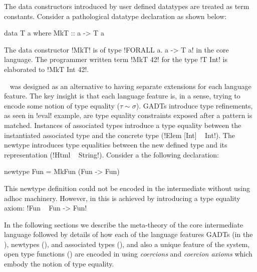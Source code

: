 \documentclass[screen,nonacm,manuscript,review]{acmart} %
\begin{document}
The data constructors introduced by user defined datatypes are treated as
term constants. Consider a pathological datatype declaration as shown
below:

\begin{CenteredBox}
\begin{code}
  data T a where MkT :: a -> T a
\end{code}
\end{CenteredBox}

The data constructor !MkT! is of type !FORALL a. a -> T a! in the
core language. The programmer written term !MkT 42! for the type
!T Int! is elaborated to !MkT Int 42!.

\SFC~\cite{sulzmann_system_2007} was designed as an
alternative to having separate extensions for
each language feature. The key insight is that each language feature
is, in a sense, trying to encode some notion of type equality
($\tau\sim\sigma$). GADTs introduce type refinements, as seen in
!eval! example, are type equality constraints exposed after a pattern
is matched. Instances of associated types introduce a type equality
between the instantiated associated type and the concrete type
(!Elem [Int] ~ Int!). The newtype introduces
type equalities between the new defined type and its representation
(!Html ~ String!). Consider a the following declaration:

\begin{CenteredBox}
\begin{code}
newtype Fun = MkFun (Fun -> Fun)
\end{code}
\end{CenteredBox}

This newtype definition could not be encoded in the intermediate
\SF without using adhoc machinery. However, in \SFC this is achieved
by introducing a type equality axiom: !Fun ~ Fun -> Fun!

In the following sections we describe the meta-theory
of the core intermediate language followed by details
of how each of the language features
GADTs (in the ), newtypes
 (), and associated
types (), and also a unique feature of
the system, open type functions () are
encoded in \SFC using \emph{coercions} and \emph{coercion
  axioms} which embody the notion of type equality.
\end{document}
